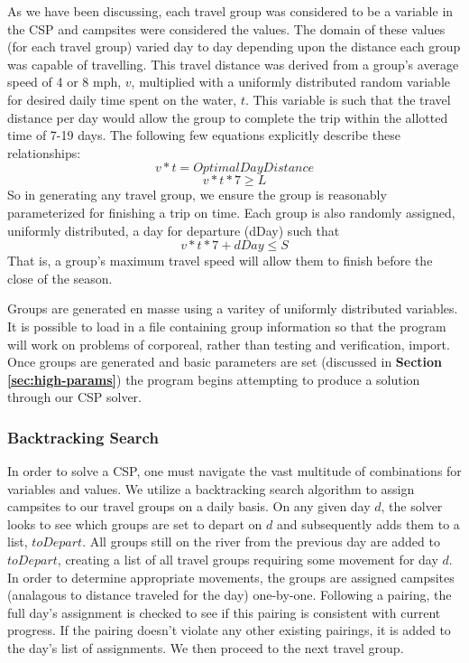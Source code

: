\documentclass[11pt]{article} %
\begin{document}
As we have been discussing, each travel group was considered to be a variable
in the CSP and campsites were considered the values.  The domain of these
values (for each travel group) varied day to day depending upon the distance
each group was capable of travelling.  This travel distance was derived from
a group's average speed of 4 or 8 mph, $v$,  multiplied with a uniformly distributed
random variable for desired daily time spent on the water, $t$.  This variable is such
that the travel distance per day would allow the group to complete the trip
within the allotted time of 7-19 days. The following few equations explicitly
describe these relationships:
$$v*t=OptimalDayDistance$$
$$v*t*7\geq L$$
So in generating any travel group, we ensure the group is reasonably
parameterized for finishing a trip on time.  Each group is also randomly
assigned, uniformly distributed, a day for departure (dDay) such that
$$v*t*7+dDay\leq S$$
That is, a group's maximum travel speed will allow them to finish before
the close of the season.

Groups are generated en masse using a varitey of uniformly distributed
variables.  It is possible to load in a file containing group information
so that the program will work on problems of corporeal, rather than testing
and verification, import.  Once groups are generated and basic parameters
are set (discussed in \textbf{Section \ref{sec:high-params}}) the program begins
attempting to produce a solution through our CSP solver.

\subsubsection{Backtracking Search}
In order to solve a CSP, one must navigate the vast multitude of combinations
for variables and values. We utilize a backtracking search algorithm to
assign campsites to our travel groups on a daily basis.  On any given day
$d$, the solver looks to see which groups are set to depart on $d$ and
subsequently adds them to a list, $toDepart$.  All groups still on the
river from the previous day are added to $toDepart$, creating a list of all
travel groups requiring some movement for day $d$.  In order to determine
appropriate movements, the groups are assigned campsites (analagous to
distance traveled for the day) one-by-one.  Following
a pairing, the full day's assignment is checked to see if this pairing is
consistent with current progress.  If the pairing doesn't violate any other
existing pairings, it is added to the day's list of assignments.  We then
proceed to the next travel group.
\end{document}
